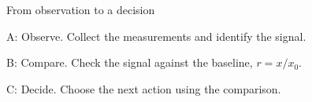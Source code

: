 \documentclass{beamer}
\begin{document}
\begin{frame}{From observation to a decision}
\begin{minipage}{0.30\textwidth}
A: Observe. Collect the measurements and identify the signal.
\end{minipage}\hfill
\begin{minipage}{0.30\textwidth}
B: Compare. Check the signal against the baseline, $r=x/x_0$.
\end{minipage}\hfill
\begin{minipage}{0.30\textwidth}
C: Decide. Choose the next action using the comparison.
\end{minipage}
\end{frame}
\end{document}
